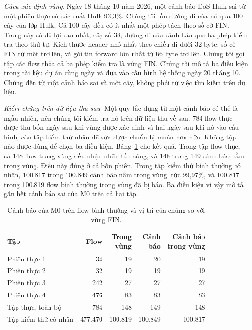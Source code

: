 \documentclass[conference]{IEEEtran}
\begin{document}
\textit{Cách xác định vùng.} Ngày 18 tháng 10 năm 2026, một cảnh báo DoS-Hulk sai từ một phiên thực có xác suất Hulk 93,3\%. Chúng tôi lần đường đi của nó qua 100 cây của lớp Hulk. Cả 100 cây đều có ít nhất một phép tách theo số cờ FIN. Trong cây có độ lợi cao nhất, cây số 38, đường đi của cảnh báo qua ba phép kiểm tra theo thứ tự. Kích thước header nhỏ nhất theo chiều đi dưới 32 byte, số cờ FIN từ một trở lên, và gói tin forward lớn nhất từ 66 byte trở lên. Chúng tôi gọi tập các flow thỏa cả ba phép kiểm tra là vùng FIN. Chúng tôi mô tả ba điều kiện trong tài liệu dự án cùng ngày và đưa vào cấu hình hệ thống ngày 20 tháng 10. Chúng đến từ một cảnh báo sai và một cây, không phải từ việc tìm kiếm trên dữ liệu.

\textit{Kiểm chứng trên dữ liệu thu sau.} Một quy tắc dựng từ một cảnh báo có thể là ngẫu nhiên, nên chúng tôi kiểm tra nó trên dữ liệu thu về sau. 784 flow thực được thu bốn ngày sau khi vùng được xác định và hai ngày sau khi nó vào cấu hình, còn tập kiểm thử nhãn đã sửa được chuẩn bị muộn hơn nữa. Không tập nào được dùng để chọn ba điều kiện. Bảng~\ref{tab:zone} cho kết quả. Trong tập flow thực, cả 148 flow trong vùng đều nhận nhãn tấn công, và 148 trong 149 cảnh báo nằm trong vùng. Điều này đúng ở cả bốn phiên. Trong tập kiểm thử bình thường có nhãn, 100.817 trong 100.849 cảnh báo nằm trong vùng, tức 99,97\%, và 100.817 trong 100.819 flow bình thường trong vùng đã bị báo. Ba điều kiện vì vậy mô tả gần hết cảnh báo sai của M0 trên cả hai tập.

\begin{table}[t]
\caption{Cảnh báo của M0 trên flow bình thường và vị trí của chúng so với vùng FIN.}
\label{tab:zone}
\centering
\footnotesize
\setlength{\tabcolsep}{4pt}
\begin{tabular}{lrrrr}
\toprule
Tập & Flow & \shortstack[r]{Trong\\vùng} & \shortstack[r]{Cảnh\\báo} & \shortstack[r]{Cảnh báo\\trong vùng} \\
\midrule
Phiên thực 1 & 34 & 19 & 20 & 19 \\
Phiên thực 2 & 32 & 19 & 19 & 19 \\
Phiên thực 3 & 242 & 27 & 27 & 27 \\
Phiên thực 4 & 476 & 83 & 83 & 83 \\
Tập thực, toàn bộ & 784 & 148 & 149 & 148 \\
\midrule
Tập kiểm thử có nhãn & 477.470 & 100.819 & 100.849 & 100.817 \\
\bottomrule
\end{tabular}
\end{table}
\end{document}

